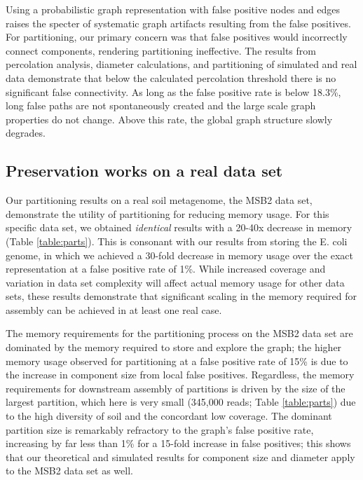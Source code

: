 \documentclass{pnastwo}
\begin{document}
\begin{article}
Using a probabilistic graph representation with false positive nodes
and edges raises the specter of systematic graph artifacts resulting
from the false positives.  For partitioning, our primary concern was
that false positives would incorrectly connect components, rendering
partitioning ineffective.  The results from percolation analysis,
diameter calculations, and partitioning of simulated and real data
demonstrate that below the calculated percolation threshold there is
no significant false connectivity.  As long as the false positive rate
is below 18.3\%, long false paths are not spontaneously created and
the large scale graph properties do not change.  Above this rate, the
global graph structure slowly degrades.

\subsection{Preservation works on a real data set}

Our partitioning results on a real soil metagenome, the MSB2 data set,
demonstrate the utility of partitioning for reducing memory usage.
For this specific data set, we obtained {\em identical} results with a
20-40x decrease in memory (Table \ref{table:parts}).  This is
consonant with our results from storing the E. coli genome, in which
we achieved a 30-fold decrease in memory usage over the exact
representation at a false positive rate of 1\%.  While increased
coverage and variation in data set complexity will affect actual
memory usage for other data sets, these results demonstrate that
significant scaling in the memory required for assembly can be
achieved in at least one real case.

The memory requirements for the partitioning process on the MSB2 data
set are dominated by the memory required to store and explore the
graph; the higher memory usage observed for partitioning at a false
positive rate of 15\% is due to the increase in component size from
local false positives.  Regardless, the memory requirements for
downstream assembly of partitions is driven by the size of the largest
partition, which here is very small (345,000 reads; Table \ref{table:parts}) 
due to the high diversity of soil and the
concordant low coverage.  The dominant partition size is remarkably
refractory to the graph's false positive rate, increasing by far less
than 1\% for a 15-fold increase in false positives; this shows that
our theoretical and simulated results for component size and diameter
apply to the MSB2 data set as well.


\end{article}
\end{document}
